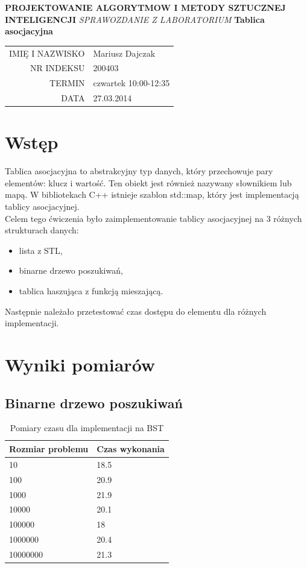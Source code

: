 \documentclass[10pt,oneside]{mwbk}
\renewcommand {\maketitle}{
\begin {titlepage}
\begin {center}
	\LARGE
	\textbf {PROJEKTOWANIE ALGORYTMOW I METODY SZTUCZNEJ INTELIGENCJI}
	\newline
	\newline
	\textit {SPRAWOZDANIE Z  LABORATORIUM}
	\textbf{ Tablica asocjacyjna}
	\newline
	\begin{table}
	\begin{center}
	\begin{tabular}{rl}
	IMIĘ I NAZWISKO & Mariusz Dajczak \\
	NR INDEKSU & 200403 \\	
	TERMIN & czwartek 10:00-12:35 \\
	DATA  & 27.03.2014 \\
	\end{tabular}

	\end{center}
	\end{table}
\end {center}
\end {titlepage}}
\begin{document}
\maketitle
\section{Wstęp}
	

	\indent Tablica asocjacyjna to abstrakcyjny typ danych, który przechowuje pary elementów: klucz i wartość. Ten obiekt jest również nazywany słownikiem lub mapą. W bibliotekach C++ istnieje szablon std::map, który jest implementacją tablicy asocjacyjnej. \\
	\indent Celem tego ćwiczenia było zaimplementowanie tablicy asocjacyjnej na 3 różnych strukturach danych:
	\begin {itemize}
		\item        lista z STL,
		\item  binarne drzewo poszukiwań,
		\item  tablica haszująca z funkcją mieszającą.\\
	\end {itemize} 
	Następnie należało przetestować czas dostępu do elementu dla różnych implementacji.
\section {Wyniki pomiarów}
	\subsection {Binarne drzewo poszukiwań}

	\begin{table}[h]
	\centering
    \begin{tabular}{|l|l|}
    \hline
     Rozmiar problemu & Czas wykonania \\ \hline
    10                & 18.5           \\ \hline
    100               & 20.9           \\ \hline
    1000              & 21.9           \\ \hline
    10000             & 20.1           \\ \hline
    100000            & 18             \\ \hline
    1000000           & 20.4           \\ \hline
    10000000          & 21.3           \\ \hline
    \end{tabular}
    \caption {Pomiary czasu dla implementacji na BST}
\end{table}
\end{document}
